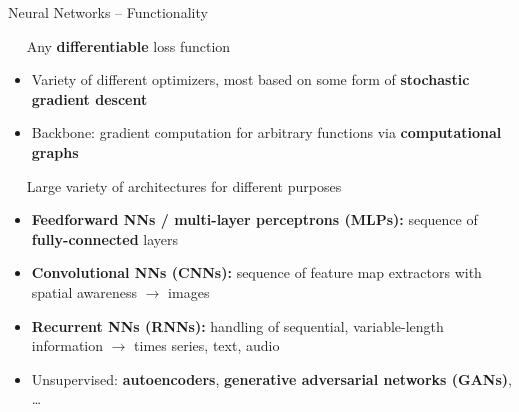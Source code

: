 
\begin{frame}{Neural Networks -- Functionality}

\footnotesize

 ~~ Any \textbf{differentiable} loss function

\medskip


\begin{itemize}
  \item Variety of different optimizers, most based on some form of 
  \textbf{stochastic gradient descent}
  \item Backbone: gradient computation for arbitrary functions via 
  \textbf{computational graphs}
\end{itemize}

\medskip

 ~~ Large variety of architectures for different purposes
\begin{itemize}
  \item \textbf{Feedforward NNs / multi-layer perceptrons (MLPs):} sequence of 
  \textbf{fully-connected} layers
  \item \textbf{Convolutional NNs (CNNs):} sequence of feature map extractors 
  with spatial awareness $\rightarrow$ images
  \item \textbf{Recurrent NNs (RNNs):} handling of sequential, variable-length 
  information $\rightarrow$ times series, text, audio
  \item Unsupervised: \textbf{autoencoders}, \textbf{generative adversarial 
  networks (GANs)}, \dots
\end{itemize}



\end{frame}
